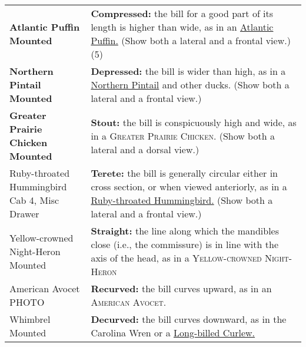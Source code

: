\documentclass[10pt]{article}
\newif\ifprintkey
\newcommand{\PrintKey}[1]{\ifprintkey{\textbf{#1}}\fi}
\begin{document}
\begin{longtable}{@{}C{0.45\textwidth}L{0.45\textwidth}@{}}
\PrintKey{\textbf{Atlantic Puffin \newline Mounted}} & \textbf{Compressed:} the bill for a good part of its length is higher than wide, as in an %
\href{https://www.allaboutbirds.org/guide/Atlantic_Puffin}{Atlantic Puffin.} (Show both a lateral and a frontal view.) (5)\\ [2.5cm]
%
\PrintKey{\textbf{Northern Pintail \newline Mounted}}& \textbf{Depressed:} the bill is wider than high, as in a \href{https://www.allaboutbirds.org/guide/Northern_Pintail}{Northern Pintail} and other ducks. (Show both a lateral and a frontal view.)\\ [2.5cm]
%
\PrintKey{\textbf{Greater Prairie Chicken \newline Mounted}} & \textbf{Stout:} the bill is conspicuously high and wide, as in a \textsc{Greater Prairie Chicken.} %
(Show both a lateral and a dorsal view.)\\ [2.5cm]
%
\PrintKey{Ruby-throated Hummingbird \newline Cab 4, Misc Drawer} & \textbf{Terete:} the bill is generally circular either in cross section, or when viewed anteriorly, as in a \href{https://www.allaboutbirds.org/guide/Ruby-throated_Hummingbird}{Ruby-throated Hummingbird.} (Show both a lateral and a frontal view.)\\ [2.5cm]
%
\PrintKey{Yellow-crowned Night-Heron \newline Mounted}%
& \textbf{Straight:} the line along which the mandibles close (i.e., the commissure) is in line with the axis of the head, as in a \textsc{Yellow-crowned Night-Heron} %
\\ [2.5cm]
%
\PrintKey{American Avocet \newline PHOTO} %
& \textbf{Recurved:} the bill curves upward, as in an \textsc{American Avocet.} %
\\ [2.5cm]
%
\PrintKey{Whimbrel \newline Mounted} & \textbf{Decurved:} the bill curves downward, as in the Carolina Wren %
or a \href{https://www.allaboutbirds.org/guide/Long-billed_Curlew}{Long-billed Curlew.} \\ [2.5cm]

\end{longtable}
\end{document}
